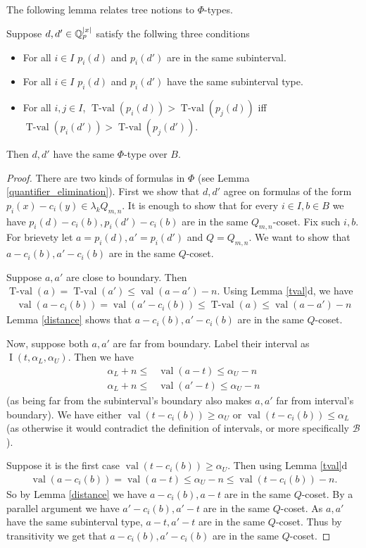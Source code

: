 \documentclass{amsart}
\newcommand{\BB}{\mathscr B}
\DeclareMathOperator{\val}{val}
\DeclareMathOperator{\tval}{T-val}
\DeclareMathOperator{\inti}{I}
\newcommand{\interval}{\inti(t, \alpha_L, \alpha_U)}
\begin{document}
The following lemma relates tree notions to $\Phi$-types.
\begin{Lemma} \label{main_lemma}
  Suppose $d, d' \in \mathbb{Q}_p^{|x|}$ satisfy the follwing three conditions 
  \begin{itemize}
  \item For all $i \in I$ $p_i(d)$ and $p_i(d')$ are in the same subinterval.
  \item For all $i \in I$ $p_i(d)$ and $p_i(d')$ have the same subinterval type.
  \item For all $i,j \in I$, $\tval(p_i(d)) > \tval(p_j(d))$ iff $\tval(p_i(d')) > \tval(p_j(d'))$.
  \end{itemize}
  Then $d, d'$ have the same $\Phi$-type over $B$.
\end{Lemma}
\begin{proof}
  There are two kinds of formulas in $\Phi$
  (see Lemma \ref{quantifier_elimination}).
  First we show that $d, d'$ agree on formulas of the form $p_i(x) - c_i(y) \in \lambda_k Q_{m,n}$.
  It is enough to show that for every $i \in I, b \in B$ we have $p_i(d) - c_i(b), p_i(d') - c_i(b)$ are in the same $Q_{m,n}$-coset.
  Fix such $i, b$.
  For brievety let $a = p_i(d), a' = p_i(d')$ and $Q = Q_{m,n}$.
  We want to show that $a - c_i(b), a' - c_i(b)$ are in the same $Q$-coset.
  
  Suppose $a, a'$ are close to boundary.
  Then $\tval(a) = \tval(a') \leq \val(a - a') - n$.
  Using Lemma \ref{tval}d, we have
  \begin{align*}
    \val(a - c_i(b)) = \val(a' - c_i(b)) \leq \tval(a) \leq \val(a - a') - n
  \end{align*}
  Lemma \ref{distance} shows that $a - c_i(b), a' - c_i(b)$ are in the same $Q$-coset.
  
  Now, suppose both $a, a'$ are far from boundary.
  Label their interval as $\interval$.
  Then we have 
  \begin{align*}
    \alpha_L + n \leq &\val (a - t) \leq \alpha_U - n \\
    \alpha_L + n \leq &\val (a' - t) \leq \alpha_U - n
  \end{align*}
  (as being far from the subinterval's boundary also makes $a,a'$ far from interval's boundary).
  We have either $\val(t - c_i(b)) \geq \alpha_U$ or $\val(t - c_i(b)) \leq \alpha_L$ (as otherwise it would contradict the definition of intervals, or more specifically $\BB$).
  
  Suppose it is the first case $\val(t - c_i(b)) \geq \alpha_U$.
  Then using Lemma \ref{tval}d
  \begin{align*}
    \val(a - c_i(b)) = \val(a - t) \leq \alpha_U - n \leq \val(t - c_i(b)) - n.
  \end{align*}
  So by Lemma \ref{distance} we have $a - c_i(b), a - t$ are in the same $Q$-coset.
  By a parallel argument we have $a' - c_i(b), a' - t$ are in the same $Q$-coset.
  As $a, a'$ have the same subinterval type, $a - t, a' - t$ are in the same $Q$-coset.
  Thus by transitivity we get that $a - c_i(b), a' - c_i(b)$ are in the same $Q$-coset.
  

\end{proof}
\end{document}
